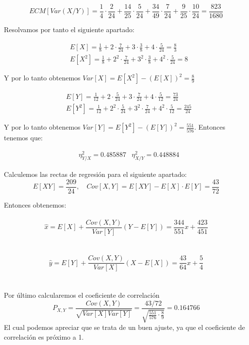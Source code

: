 \documentclass[fleqn]{article}
\begin{document}
    $$ECM[Var(X/Y)] = \frac{1}{4} \cdot \frac{2}{24} + \frac{14}{25} \cdot \frac{5}{24} + \frac{34}{49} \cdot \frac{7}{24} + \frac{9}{25} \cdot \frac{10}{24} = \frac{823}{1680}$$
 
    \newpage

    Resolvamos por tanto el siguiente apartado:

    \begin{align*}
        &E[X] = \frac{1}{8} + 2\cdot\frac{7}{24} + 3\cdot\frac{3}{8} + 4 \cdot \frac{5}{24} = \frac{8}{3} \\
        &E[X^2] = \frac{1}{8} + 2^2\cdot\frac{7}{24} + 3^2\cdot\frac{3}{8} + 4^2\cdot \frac{5}{24} = 8 
    \end{align*}

    Y por lo tanto obtenemos $Var[X] = E[X^2] - \left(E[X]\right)^2 = \frac{8}{9}$

    \begin{align*}
        &E[Y] = \frac{1}{12} + 2\cdot\frac{5}{24} + 3\cdot\frac{7}{24} + 4 \cdot \frac{5}{12} = \frac{73}{24} \\
        &E[Y^2] = \frac{1}{12} + 2^2\cdot\frac{5}{24} + 3^2\cdot\frac{7}{24} + 4^2\cdot \frac{5}{12} = \frac{245}{24}
    \end{align*}

    Y por lo tanto obtenemos $Var[Y] = E[Y^2] - \left(E[Y]\right)^2 =\frac{551}{576}$. Entonces tenemos que:

    \begin{align*}
        &\eta ^2 _{Y/X} = 0.485887
        &\eta ^2 _{X/Y} = 0.448884
    \end{align*}

    \newpage

    Calculemos las rectas de regresión para el siguiente apartado:
    $$E[XY] = \frac{209}{24}, \quad Cov[X,Y] = E[XY] - E[X]\cdot E[Y] = \frac{43}{72}$$

    Entonces obtenemos:\\

    \\
    $$\hat{x} = E[X] + \frac{Cov(X,Y)}{Var[Y]}(Y-E[Y]) = \frac{344}{551}x + \frac{423}{451}$$\\

    \\
    $$\hat{y} = E[Y] + \frac{Cov(X,Y)}{Var[X]}(X-E[X]) = \frac{43}{64}x + \frac{5}{4}$$\\ \\

    Por último calcularemos el coeficiente de correlación
    $$P_{X,Y} = \frac{Cov(X,Y)}{\sqrt{Var[X]Var[Y]}} = \frac{43/72}{\sqrt{\frac{551}{576}\cdot \frac{8}{9}}} = 0.164766$$
    El cual podemos apreciar que se trata de un buen ajuste, ya que el coeficiente de correlación es próximo a 1.
\end{document}
